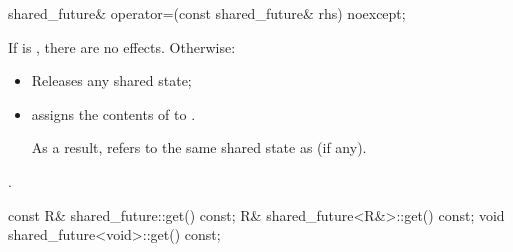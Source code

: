 %
\begin{itemdecl}
shared_future& operator=(const shared_future& rhs) noexcept;
\end{itemdecl}

\begin{itemdescr}
\pnum
\effects
If  is , there are no effects.
Otherwise:
\begin{itemize}
\item
Releases any shared state;
\item
assigns the contents of  to .
\begin{note}
As a result,
 refers to the same shared state as 
(if any).
\end{note}
\end{itemize}

\pnum
\ensures
{}.
\end{itemdescr}

%
\begin{itemdecl}
const R& shared_future::get() const;
R& shared_future<R&>::get() const;
void shared_future<void>::get() const;
\end{itemdecl}

